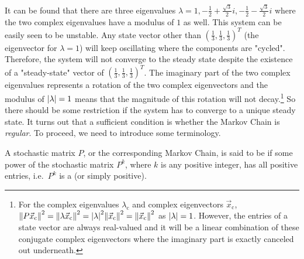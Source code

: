 It can be found that there are three eigenvalues $\lambda = 1, -\frac{1}{2} + \frac{\sqrt{3}}{2}i, -\frac{1}{2} - \frac{\sqrt{3}}{2}i$ where the two complex eigenvalues have a modulus of $1$ as well. This system can be easily seen to be unstable. Any state vector other than $(\frac{1}{3}, \frac{1}{3}, \frac{1}{3})^T$ (the eigenvector for $\lambda = 1$) will keep oscillating where the components are "cycled". Therefore, the system will not converge to the steady state despite the existence of a "steady-state" vector of $(\frac{1}{3}, \frac{1}{3}, \frac{1}{3})^T$. The imaginary part of the two complex eigenvalues represents a rotation of the two complex eigenvectors and the modulus of $\abs{\lambda} = 1$ means that the magnitude of this rotation will not decay.\footnote{For the complex eigenvalues $\lambda_{\text{c}}$ and complex eigenvectors $\vec{x}_{\text{c}}$, $\norm{P\vec{x}_{\text{c}}}^2 = \norm{\lambda\vec{x}_{\text{c}}}^2 = \abs{\lambda}^2 \norm{\vec{x}_{\text{c}}}^2 = \norm{\vec{x}_{\text{c}}}^2$ as $\abs{\lambda} = 1$. However, the entries of a state vector are always real-valued and it will be a linear combination of these conjugate complex eigenvectors where the imaginary part is exactly canceled out underneath.} So there should be some restriction if the system has to converge to a unique steady state. It turns out that a sufficient condition is whether the Markov Chain is \textit{regular}. To proceed, we need to introduce some terminology.

\begin{defn}
\label{defn:regularstoc}
A stochastic matrix $P$, or the corresponding Markov Chain, is said to be  if some power of the stochastic matrix $P^k$, where $k$ is any positive integer, has all positive entries, i.e.\ $P^k$ is a  (or simply positive).
\end{defn}


